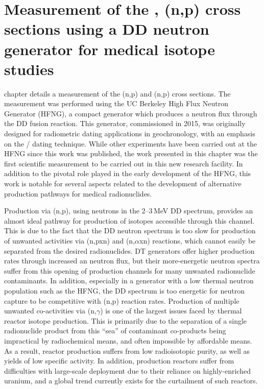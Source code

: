 \chapter{Measurement of the \texorpdfstring{, }{64Zn, 47Ti}(n,p) cross sections using a DD neutron generator for medical isotope studies}\label{sec:chapter_hfng}


 chapter details a measurement of the (n,p) and (n,p) cross sections.
The measurement was performed using the UC Berkeley High Flux Neutron Generator (HFNG), a compact generator which produces a neutron flux through the DD fusion reaction.
This generator, commissioned in 2015, was originally designed for radiometric dating applications in geochronology, with an emphasis on the / dating technique.
While other experiments have been carried out at the HFNG since this work was published, the work presented in this chapter was the first scientific measurement to be carried out in this new research facility.
In addition to the pivotal role played in the early development of the HFNG, this work is notable for several aspects related to the development of alternative production pathways for medical radionuclides.


Production via (n,p), using neutrons in the 2--3\,MeV DD spectrum, provides an almost ideal pathway for production of  isotopes accessible through this channel.
This is due to the fact that the DD neutron spectrum is too slow for production of unwanted activities via (n,pxn) and (n,$\alpha$xn) reactions, which cannot easily be separated from the desired radionuclides. 
DT generators offer higher production rates through increased an neutron flux, but their more-energetic neutron spectra suffer from this opening of production channels for many unwanted radionuclide contaminants.
In addition, especially in a generator with a low thermal neutron population such as the HFNG, the DD spectrum is too energetic for  neutron capture to be competitive with (n,p) reaction rates.
Production of multiple unwanted co-activities via (n,$\gamma$) is one of the largest issues faced by thermal reactor isotope production.
This is primarily due to the separation of a single radionuclide product from this \enquote{sea} of contaminant co-products being impractical by radiochemical means, and often impossible by affordable means.
As a result, reactor production suffers from low radioisotopic purity, as well as yields of low specific activity.
In addition, production reactors suffer from difficulties with large-scale deployment due to their reliance on highly-enriched uranium, and  a global trend currently exists for the curtailment of such reactors.


